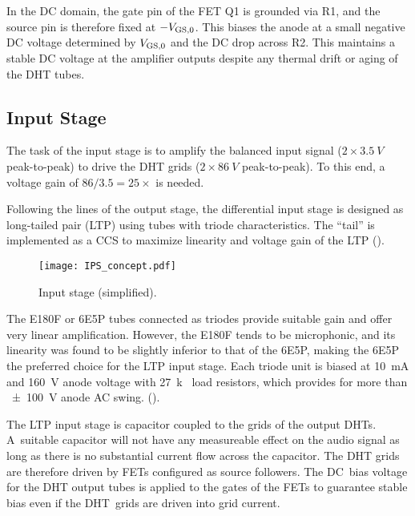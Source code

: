 In the DC domain, the gate pin of the FET Q1 is grounded via R1, and the source pin is therefore fixed at $-V_{\rm GS,0}$. This biases the anode at a small negative DC voltage determined by $V_{\rm GS,0}$ and the DC drop across R2. This maintains a stable DC voltage at the amplifier outputs despite any thermal drift or aging of the DHT tubes.


\subsection{Input Stage}

The task of the input stage is to amplify the balanced input signal ($2 \times \SI{3.5}{V}$ peak-to-peak) to drive the DHT grids ($2 \times \SI{86}{V}$ peak-to-peak). To this end, a voltage gain of $86 / 3.5 = 25\times$ is needed.\par

Following the lines of the output stage, the differential input stage is designed as long-tailed pair (LTP)\cite{valvewizard_LTP} using tubes with triode characteristics. The ``tail'' is implemented as a CCS to maximize linearity and voltage gain of the LTP ().

\begin{figure}
\begin{center}
\texttt{[image: IPS\_concept.pdf]}
\caption{Input stage (simplified).}
\end{center}
\end{figure}

The E180F or 6E5P tubes connected as triodes provide suitable gain and offer very linear amplification\cite{bartola_thdbenchmark,millett_pentodes,klausmobile_testerfiles}. However, the E180F tends to be microphonic\cite{osdeha_p23}, and its linearity was found to be slightly inferior to that of the 6E5P\cite{osdeha_p32}, making the 6E5P the preferred choice for the LTP input stage. Each triode unit is biased at \SI{10}{mA} and \SI{160}{V} anode voltage with \SI{27}{k\Ohm} load resistors, which provides for more than \SI{\pm100}{V} anode AC swing. ().

The LTP input stage is capacitor coupled to the grids of the output DHTs. A suitable capacitor will not have any measureable effect on the audio signal\cite{bateman_caps_distortion} as long as there is no substantial current flow across the capacitor\cite{aiken_farting_out}. The DHT grids are therefore driven by FETs configured as source followers. The DC bias voltage for the DHT output tubes is applied to the gates of the FETs to guarantee stable bias even if the DHT grids are driven into grid current.

